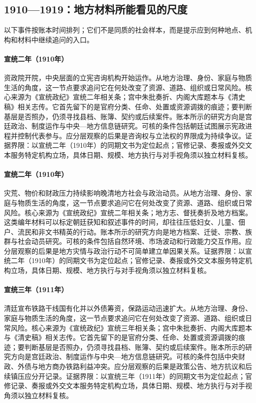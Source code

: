 \subsection{1910—1919：地方材料所能看见的尺度}
以下事件按账本时间排列；它们不是同质的社会样本，而是提示应到何种地点、机构和材料中继续追问的入口。
\hypertarget{social:EQ-1910-ZIZHENG-YUAN}{}\paragraph{宣统二年（1910年）}资政院开院，中央层面的立宪咨询机构开始运作。从地方治理、身份、家庭与物质生活的角度，这一节点要求追问它在何处改变了资源、道路、组织或日常风险。核心来源为《宣统政纪》宣统二年相关条；宫中朱批奏折、内阁大库题本与《清史稿》相关志传。它首先留下的是官府分类、任命、处置或资源调拨的痕迹；要判断基层是否照办，仍须寻找县档、账簿、契约或后续案件。账本所示的研究方向是宫廷政治、制度运作与中央—地方信息链研究。可核的条件包括朝廷试图展示宪政进程并控制代表参与。应分层观察的后果是咨询权与立法权的界限成为持续争议。证据界限：以宣统二年（1910年）的同期文书为定位起点；官修记录、奏报或外交文本服务特定机构立场，具体日期、规模、地方执行与对手视角须以独立材料复核。
\hypertarget{social:EQ-1910-FAMINE-AND-UNREST}{}\paragraph{宣统二年（1910年）}灾荒、物价和财政压力持续影响晚清地方社会与政治动员。从地方治理、身份、家庭与物质生活的角度，这一节点要求追问它在何处改变了资源、道路、组织或日常风险。核心来源为《宣统政纪》宣统二年相关条；地方志、督抚奏折及地方档案。这类编年材料可以标定朝廷获知和叙述事件的时间，却往往压低妇女、儿童、佃户、流民和非文书精英的行动。账本所示的研究方向是地方档案、迁徙、宗教、族群与社会动员研究。可核的条件包括自然环境、市场波动和行政能力交互作用。应分层观察的后果是地方灾情与政治行动不可简单建立单因果关系。证据界限：以宣统二年（1910年）的同期文书为定位起点；官修记录、奏报或外交文本服务特定机构立场，具体日期、规模、地方执行与对手视角须以独立材料复核。
\hypertarget{social:EQ-1911-RAILWAY-NATIONALIZATION}{}\paragraph{宣统三年（1911年）}清廷宣布铁路干线国有化并以外债筹资，保路运动迅速扩大。从地方治理、身份、家庭与物质生活的角度，这一节点要求追问它在何处改变了资源、道路、组织或日常风险。核心来源为《宣统政纪》宣统三年相关条；宫中朱批奏折、内阁大库题本与《清史稿》相关志传。它首先留下的是官府分类、任命、处置或资源调拨的痕迹；要判断基层是否照办，仍须寻找县档、账簿、契约或后续案件。账本所示的研究方向是宫廷政治、制度运作与中央—地方信息链研究。可核的条件包括中央财政、外债与地方商办铁路利益冲突。应分层观察的后果是政策公告、地方抗议和后续镇压应分开记录。证据界限：以宣统三年（1911年）的同期文书为定位起点；官修记录、奏报或外交文本服务特定机构立场，具体日期、规模、地方执行与对手视角须以独立材料复核。
